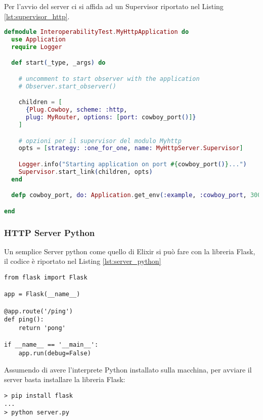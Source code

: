 Per l'avvio del server ci si affida ad un Supervisor
riportato nel Listing \ref{lst:supervisor_http}.

\begin{lstlisting}[language=elixir, caption={Supervisor dell'applicazione HTTP},
	captionpos=b,label={lst:supervisor_http}]
defmodule InteroperabilityTest.MyHttpApplication do
  use Application
  require Logger

  def start(_type, _args) do

    # uncomment to start observer with the application
    # Observer.start_observer()

    children = [
      {Plug.Cowboy, scheme: :http,
	  plug: MyRouter, options: [port: cowboy_port()]}
    ]

    # opzioni per il supervisor del modulo Myhttp
    opts = [strategy: :one_for_one, name: MyHttpServer.Supervisor]

    Logger.info("Starting application on port #{cowboy_port()}...")
    Supervisor.start_link(children, opts)
  end

  defp cowboy_port, do: Application.get_env(:example, :cowboy_port, 3000)

end
\end{lstlisting}

\subsubsection{HTTP Server Python}

Un semplice Server python come quello di Elixir si può fare con
la libreria Flask, il codice è riportato nel Listing \ref{lst:server_python}

\begin{lstlisting}[language=ipython, caption={Server Python(Flask)},
	captionpos=b,label={lst:server_python}]
from flask import Flask

app = Flask(__name__)
	
@app.route('/ping')
def ping():
    return 'pong'
	
if __name__ == '__main__':
    app.run(debug=False)

\end{lstlisting}

Assumendo di avere l'interprete Python
installato sulla macchina, per
avviare il server basta installare la libreria Flask:

\begin{lstlisting}[language=none]
> pip install flask
...
> python server.py
\end{lstlisting}


